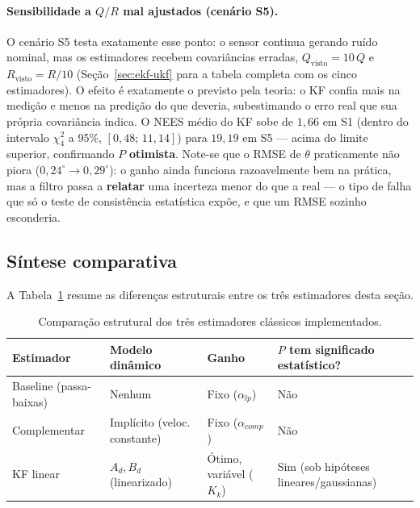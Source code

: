 \documentclass[brazil, 12pt]{article}
\begin{document}
\paragraph{Sensibilidade a $Q/R$ mal ajustados (cenário S5).} O cenário S5
testa exatamente esse ponto: o sensor continua gerando ruído nominal, mas os
estimadores recebem covariâncias erradas, $Q_{\text{visto}}=10\,Q$ e
$R_{\text{visto}}=R/10$ (Seção~\ref{sec:ekf-ukf} para a tabela completa com os
cinco estimadores). O efeito é exatamente o previsto pela teoria: o KF confia
mais na medição e menos na predição do que deveria, subestimando o erro real
que sua própria covariância indica. O NEES médio do KF sobe de
$1{,}66$ em S1 (dentro do intervalo $\chi^2_4$ a 95\%, $[0{,}48;\,11{,}14]$)
para $19{,}19$ em S5 — acima do limite superior, confirmando $P$
\textbf{otimista}. Note-se que o RMSE de $\theta$ praticamente não piora
($0{,}24^{\circ}\to0{,}29^{\circ}$): o ganho ainda funciona razoavelmente bem
na prática, mas a filtro passa a \textbf{relatar} uma incerteza menor do que a
real — o tipo de falha que só o teste de consistência estatística expõe, e que
um RMSE sozinho esconderia.

\subsection{Síntese comparativa}
\label{sec:sintese-classicos}

A Tabela~\ref{tab:classicos} resume as diferenças estruturais entre os três
estimadores desta seção.

\begin{table}[H]
\centering
\small
\begin{tabular}{@{}p{3.1cm} p{3.4cm} p{2.6cm} p{3.3cm}@{}}
\hline
\textbf{Estimador} & \textbf{Modelo dinâmico} & \textbf{Ganho} & \textbf{$P$ tem significado estatístico?} \\
\hline
Baseline (passa-baixas)  & Nenhum                        & Fixo ($\alpha_{lp}$)             & Não \\[2pt]
Complementar             & Implícito (veloc. constante)  & Fixo ($\alpha_{comp}$)           & Não \\[2pt]
KF linear                & $A_d,B_d$ (linearizado)       & Ótimo, variável ($K_k$)          & Sim (sob hipóteses lineares/gaussianas) \\
\hline
\end{tabular}
\caption{Comparação estrutural dos três estimadores clássicos implementados.}
\label{tab:classicos}
\end{table}
\end{document}
